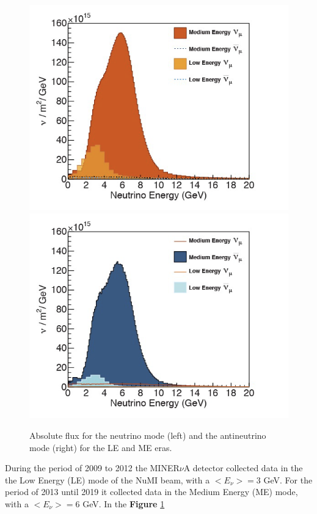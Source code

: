 \begin{figure}[!htb]
\centering
\includegraphics[scale=0.38]{Figures/Chapter2/fluxantineutrino.png}\includegraphics[scale=0.38]{Figures/Chapter2/fluxneutrino.png}
        \caption{Absolute flux for the neutrino mode (left) and the antineutrino mode (right) for the LE and ME eras.} 
\label{fig:MnvExp:NuMI:Flux}
\end{figure}

During the period of 2009 to 2012 the MINER$\nu$A detector collected data in the the Low Energy (LE) mode of the NuMI beam, with a $<E_\nu> = 3$ GeV. For the period of 2013 until 2019 it collected data in the Medium Energy (ME) mode, with a $<E_\nu> = 6$ GeV.  In the \textbf{Figure} \ref{fig:MnvExp:NuMI:Flux} 




